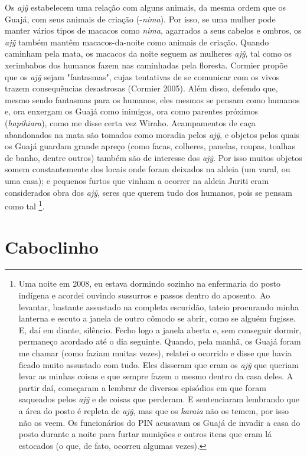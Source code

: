 Os \emph{ajỹ} estabelecem uma relação com alguns animais, da mesma ordem
que os Guajá, com seus animais de criação (-\emph{nima}). Por isso, se
uma mulher pode manter vários tipos de macacos como \emph{nima},
agarrados a seus cabelos e ombros, os \emph{ajỹ} também mantêm
macacos-da-noite como animais de criação. Quando caminham pela mata, os
macacos da noite seguem as mulheres \emph{ajỹ}, tal como os xerimbabos
dos humanos fazem nas caminhadas pela floresta. Cormier propõe que os
\emph{ajỹ} sejam "fantasmas", cujas tentativas de se comunicar com os
vivos trazem consequências desastrosas (Cormier 2005). Além disso,
defendo que, mesmo sendo fantasmas para os humanos, eles mesmos se
pensam como humanos e, ora enxergam os Guajá como inimigos, ora como
parentes próximos (\emph{hapihiara}), como me disse certa vez Wiraho.
Acampamentos de caça abandonados na mata são tomados como moradia pelos
\emph{ajỹ}, e objetos pelos quais os Guajá guardam grande apreço (como
facas, colheres, panelas, roupas, toalhas de banho, dentre outros)
também são de interesse dos \emph{ajỹ}. Por isso muitos objetos somem
constantemente dos locais onde foram deixados na aldeia (um varal, ou
uma casa); e pequenos furtos que vinham a ocorrer na aldeia Juriti eram
considerados obra dos \emph{ajỹ}, seres que querem tudo dos humanos,
pois se pensam como tal \footnote{Uma noite em 2008, eu estava dormindo
  sozinho na enfermaria do posto indígena e acordei ouvindo sussurros e
  passos dentro do aposento. Ao levantar, bastante assustado na completa
  escuridão, tateio procurando minha lanterna e escuto a janela de outro
  cômodo se abrir, como se alguém fugisse. E, daí em diante, silêncio.
  Fecho logo a janela aberta e, sem conseguir dormir, permaneço acordado
  até o dia seguinte. Quando, pela manhã, os Guajá foram me chamar (como
  faziam muitas vezes), relatei o ocorrido e disse que havia ficado
  muito assustado com tudo. Eles disseram que eram os \emph{ajỹ} que
  queriam levar as minhas coisas e que sempre fazem o mesmo dentro da
  casa deles. A partir daí, começaram a lembrar de diversos episódios em
  que foram saqueados pelos \emph{ajỹ} e de coisas que perderam. E
  sentenciaram lembrando que a área do posto é repleta de \emph{ajỹ},
  mas que os \emph{karaia} não os temem, por isso não os veem. Os
  funcionários do PIN acusavam os Guajá de invadir a casa do posto
  durante a noite para furtar munições e outros itens que eram lá
  estocados (o que, de fato, ocorreu algumas vezes).}.

\section{Caboclinho}

